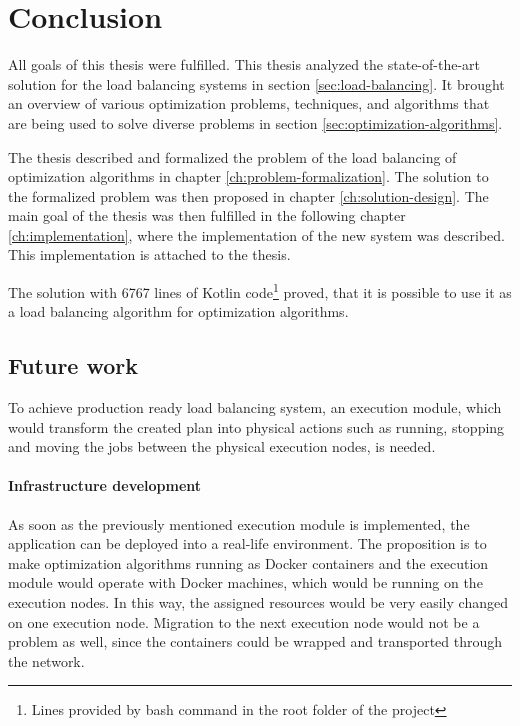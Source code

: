 \chapter{Conclusion}\label{ch:conclusion}
All goals of this thesis were fulfilled.
This thesis analyzed the state-of-the-art solution for the load balancing systems in section \ref{sec:load-balancing}. 
It brought an overview of various optimization problems, techniques, and algorithms 
that are being used to solve diverse problems in section \ref{sec:optimization-algorithms}.

The thesis described and formalized the problem of the load balancing of optimization algorithms in chapter \ref{ch:problem-formalization}.
The solution to the formalized problem was then proposed in chapter \ref{ch:solution-design}.
The main goal of the thesis was then fulfilled in the following chapter \ref{ch:implementation},
where the implementation of the new system was described.
This implementation is attached to the thesis.

The solution with 6767 lines of Kotlin 
code\footnote{Lines provided by  bash command in the root folder of the project} 
proved, that it is possible to use it as a load balancing algorithm for optimization algorithms.

\section{Future work}\label{sec:future-work}
To achieve production ready load balancing system,
an execution module, 
which would transform the created plan into physical actions 
such as running, stopping and moving the jobs between the physical execution nodes,
is needed.

\subsubsection{Infrastructure development}
As soon as the previously mentioned execution module is implemented,
the application can be deployed into a real-life environment.
The proposition is to make optimization algorithms running as Docker containers and the execution module would operate with Docker machines,
which would be running on the execution nodes. 
In this way, 
the assigned resources would be very easily changed on one execution node.
Migration to the next execution node would not be a problem as well, 
since the containers could be wrapped and transported through the network.

